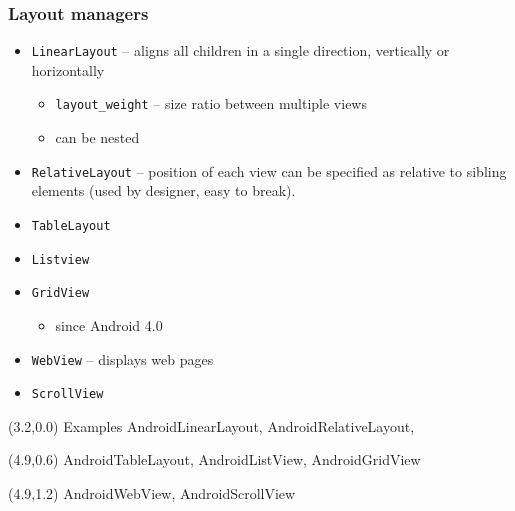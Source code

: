 \documentclass[10pt,xcolor=pdflatex]{beamer}
\begin{document}
\begin{frame}\frametitle{Layout managers}
	\begin{itemize}
		\item \texttt{LinearLayout} -- aligns all children in a single direction, vertically or horizontally
          \begin{itemize}
            \item \texttt{layout\_weight} -- size ratio between multiple views
            \item can be nested
          \end{itemize}
		\item \texttt{RelativeLayout} -- position of each view can be specified as relative to sibling elements (used by designer, easy to break).
		\item \texttt{TableLayout}
		\item \texttt{Listview}
		\item \texttt{GridView}
          \begin{itemize}
        	\item since Android 4.0
          \end{itemize}
		\item \texttt{WebView} -- displays web pages
		\item \texttt{ScrollView}
	\end{itemize}
\begin{textblock}{15}(3.2,0.0)
    {\footnotesize Examples AndroidLinearLayout, AndroidRelativeLayout,}
\end{textblock}
\begin{textblock}{15}(4.9,0.6)
    {\footnotesize AndroidTableLayout, AndroidListView, AndroidGridView}
\end{textblock}
\begin{textblock}{15}(4.9,1.2)
    {\footnotesize AndroidWebView, AndroidScrollView}
\end{textblock}
\end{frame}
\end{document}
